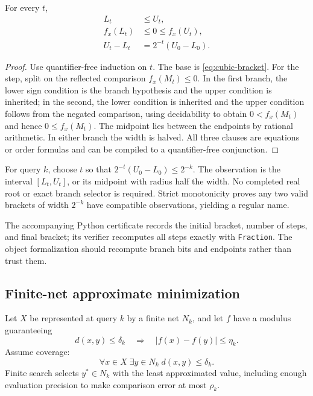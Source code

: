 \begin{theorem}
For every \(t\),
\begin{align}
 L_t&\leq U_t,\label{eq:bisect-order}\\
 f_x(L_t)&\leq0\leq f_x(U_t),\label{eq:bisect-sign}\\
 U_t-L_t&=2^{-t}(U_0-L_0).\label{eq:bisect-width}
\end{align}
\end{theorem}

\begin{proof}
Use quantifier-free induction on \(t\).  The base is \eqref{eq:cubic-bracket}.  For the step, split on the reflected comparison \(f_x(M_t)\leq0\).  In the first branch, the lower sign condition is the branch hypothesis and the upper condition is inherited; in the second, the lower condition is inherited and the upper condition follows from the negated comparison, using decidability to obtain \(0<f_x(M_t)\) and hence \(0\leq f_x(M_t)\).  The midpoint lies between the endpoints by rational arithmetic.  In either branch the width is halved.  All three clauses are equations or order formulas and can be compiled to a quantifier-free conjunction.
\end{proof}

For query \(k\), choose \(t\) so that \(2^{-t}(U_0-L_0)\leq2^{-k}\).  The observation is the interval \([L_t,U_t]\), or its midpoint with radius half the width.  No completed real root or exact branch selector is required.  Strict monotonicity proves any two valid brackets of width \(2^{-k}\) have compatible observations, yielding a regular name.

The accompanying Python certificate records the initial bracket, number of steps, and final bracket; its verifier recomputes all steps exactly with \texttt{Fraction}.  The object formalization should recompute branch bits and endpoints rather than trust them.

\subsection{Finite-net approximate minimization}

Let \(X\) be represented at query \(k\) by a finite net \(N_k\), and let \(f\) have a modulus guaranteeing
\begin{equation}
 d(x,y)\leq\delta_k\quad\Longrightarrow\quad |f(x)-f(y)|\leq\eta_k.
 \label{eq:min-modulus}
\end{equation}
Assume coverage:
\begin{equation}
 \forall x\in X\;\exists y\in N_k\;d(x,y)\leq\delta_k.
 \label{eq:net-coverage}
\end{equation}
Finite search selects \(y^*\in N_k\) with the least approximated value, including enough evaluation precision to make comparison error at most \(\rho_k\).

